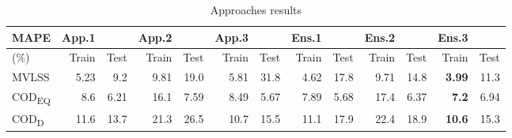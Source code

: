 \begin{longtable}[h]{@{}l *{6}{rr}}
\caption[Approaches results]{Approaches results}
\label{t:Results}
\\
%   
\toprule%


 {\bfseries MAPE } & {\bfseries App.1} & ~ & {\bfseries App.2} & ~ & {\bfseries App.3} & ~ & {\bfseries Ens.1} & ~ & {\bfseries Ens.2} & ~ & {\bfseries Ens.3}
\\

\cmidrule[0.4pt](r{0.125em}){1-1}%
\cmidrule[0.4pt](lr{0.125em}){2-3}%
\cmidrule[0.4pt](lr{0.125em}){4-5}%
\cmidrule[0.4pt](lr{0.125em}){6-7}%
\cmidrule[0.4pt](lr{0.125em}){8-9}%
\cmidrule[0.4pt](lr{0.125em}){10-11}%
\cmidrule[0.4pt](lr{0.125em}){12-13}%


  \endfirsthead

\endhead


        (\%) & Train & Test & Train & Test & Train & Test & Train & Test & Train & Test & Train & Test  \\ 
        \hline
        MVLSS & 5.23 & 9.2 & 9.81 & 19.0 & 5.81 & 31.8 & 4.62 & 17.8 & 9.71 & 14.8 & \textbf{3.99} & 11.3  \\ 
        COD\textsubscript{EQ} & 8.6 & 6.21 & 16.1 & 7.59 & 8.49 & 5.67 & 7.89 & 5.68 & 17.4 & 6.37 & \textbf{7.2} & 6.94  \\ 
        COD\textsubscript{D} & 11.6 & 13.7 & 21.3 & 26.5 & 10.7 & 15.5 & 11.1 & 17.9 & 22.4 & 18.9 & \textbf{10.6} & 15.3  \\ 


\bottomrule

\end{longtable}